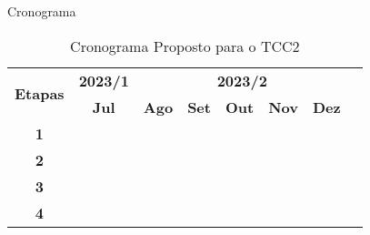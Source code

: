 \begin{frame}{Cronograma}
    \begin{table}[htpd]
        \centering
        \noindent \begin{tabular}{|c|c|c|c|c|c|c|c|}
            \hline
            \multirow{2}{*}{\textbf{\small{Etapas}}} & \multicolumn{1}{|c|}{\textbf{\small{2023/1}}} &
            \multicolumn{5}{|c|}{\textbf{\small{2023/2}}} \\
            \cline{2-7}
            &\textbf{Jul} & \textbf{Ago} & \textbf{Set} & \textbf{Out} & \textbf{Nov} & \textbf{Dez} \\
            \hline
            \textbf{\small{1}}  & \cellcolor{gray} & \cellcolor{gray} & \cellcolor{gray} & & & \\
            \hline
            \textbf{\small{2}}  & & \cellcolor{gray} & \cellcolor{gray} & & & \\
            \hline
            \textbf{\small{3}}  & & & \cellcolor{gray} & \cellcolor{gray} & & \\
            \hline
            \textbf{\small{4}}  & & & & \cellcolor{gray} & \cellcolor{gray} & \\
            \hline
            \end{tabular}
        \label{tab:Cronograma}
        \caption[Cronograma Proposto para o TCC2]{Cronograma Proposto para o TCC2}
    \end{table}
\end{frame}